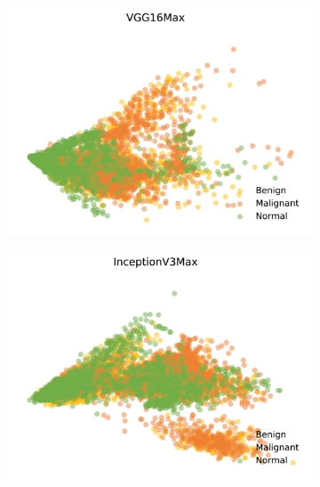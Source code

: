 \begin{figure}[H]
    \begin{subfigure}{.2\textwidth}
      \includegraphics[width=\textwidth]{contents/chapter_4/resources/visualisation_transfer_vgg16max.png}
    \end{subfigure}
    \begin{subfigure}{.2\textwidth}
      \includegraphics[width=\textwidth]{contents/chapter_4/resources/visualisation_transfer_inceptionv3max.png}
    \end{subfigure}
    \begin{subfigure}{.2\textwidth}

\end{subfigure}
\end{figure}
